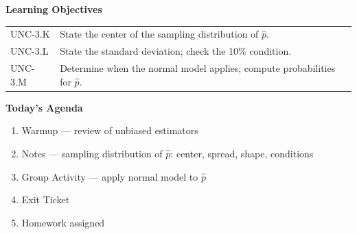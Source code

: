 \documentclass[10pt]{article}
\begin{document}
\namedateperiod

\begin{objectivebox}
\textbf{Learning Objectives}

\medskip
\begin{tabularx}{\linewidth}{@{} l X @{}}
UNC-3.K & State the center of the sampling distribution of $\hat{p}$.\\[4pt]
UNC-3.L & State the standard deviation; check the 10\% condition.\\[4pt]
UNC-3.M & Determine when the normal model applies; compute probabilities for $\hat{p}$.\\
\end{tabularx}
\end{objectivebox}

\begin{tocbox}
\textbf{Today's Agenda}
\begin{enumerate}
  \item Warmup — review of unbiased estimators
  \item Notes — sampling distribution of $\hat{p}$: center, spread, shape, conditions
  \item Group Activity — apply normal model to $\hat{p}$
  \item Exit Ticket
  \item Homework assigned
\end{enumerate}
\end{tocbox}
\end{document}

